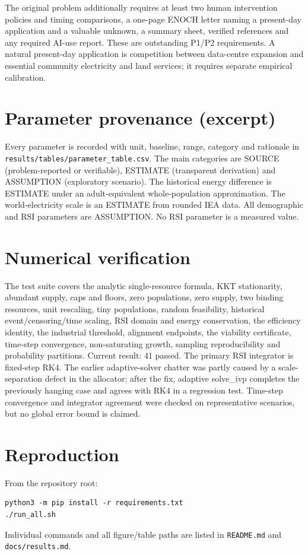 \documentclass[11pt]{article}
\begin{document}
The original problem additionally requires at least two human intervention policies and timing comparisons, a one-page ENOCH letter naming a present-day application and a valuable unknown, a summary sheet, verified references and any required AI-use report. These are outstanding P1/P2 requirements. A natural present-day application is competition between data-centre expansion and essential community electricity and land services; it requires separate empirical calibration.

\appendix
\section{Parameter provenance (excerpt)}
Every parameter is recorded with unit, baseline, range, category and rationale in \texttt{results/tables/parameter\_table.csv}. The main categories are SOURCE (problem-reported or verifiable), ESTIMATE (transparent derivation) and ASSUMPTION (exploratory scenario). The historical energy difference is ESTIMATE under an adult-equivalent whole-population approximation. The world-electricity scale is an ESTIMATE from rounded IEA data. All demographic and RSI parameters are ASSUMPTION. No RSI parameter is a measured value.

\section{Numerical verification}
The test suite covers the analytic single-resource formula, KKT stationarity, abundant supply, caps and floors, zero populations, zero supply, two binding resources, unit rescaling, tiny populations, random feasibility, historical event/censoring/time scaling, RSI domain and energy conservation, the efficiency identity, the industrial threshold, alignment endpoints, the viability certificate, time-step convergence, non-saturating growth, sampling reproducibility and probability partitions. Current result: 41 passed. The primary RSI integrator is fixed-step RK4. The earlier adaptive-solver chatter was partly caused by a scale-separation defect in the allocator; after the fix, adaptive solve_ivp completes the previously hanging case and agrees with RK4 in a regression test. Time-step convergence and integrator agreement were checked on representative scenarios, but no global error bound is claimed.

\section{Reproduction}
From the repository root:
\begin{verbatim}
python3 -m pip install -r requirements.txt
./run_all.sh
\end{verbatim}
Individual commands and all figure/table paths are listed in \texttt{README.md} and \texttt{docs/results.md}.
\end{document}
